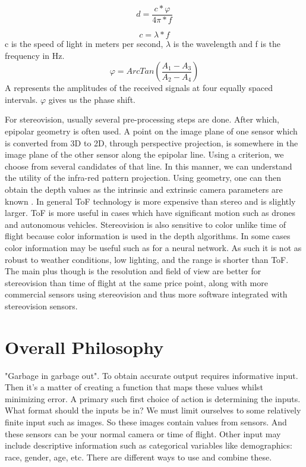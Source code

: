 \begin{equation}
	d = \frac{c * \varphi}{4\pi * f}
\end{equation}


\begin{equation}
c = \lambda * f
\end{equation}
c is the speed of light in meters per second, $\lambda$ is the wavelength and f is the frequency in Hz.
\begin{equation}
	\varphi = ArcTan(\frac{A_1 - A_3}{A_2 - A_4})
\end{equation}
A represents the amplitudes of the received signals at four equally spaced intervals.  $\varphi$ gives us the phase shift.

For stereovision, usually several pre-processing steps are done. After which, epipolar geometry is often used. A point on the image plane of one sensor which is converted from 3D to 2D, through perspective projection, is somewhere in the image plane of the other sensor along the epipolar line. Using a criterion, we choose from several candidates of that line. In this manner, we can understand the utility of the infra-red pattern projection. Using geometry, one can then obtain the depth values as the intrinsic and extrinsic camera parameters are known \cite{ayache1988rectification}. In general ToF technology is more expensive than stereo and is slightly larger. ToF is more useful in cases which have significant motion such as drones and autonomous vehicles. Stereovision is also sensitive to color unlike time of flight because color information is used in the depth algorithms. In some cases color information may be useful such as for a neural network. As such it is not as robust to weather conditions, low lighting, and the range is shorter than ToF. The main plus though is the resolution and field of view are better for stereovision than time of flight at the same price point, along with more commercial sensors using stereovision and thus more software integrated with stereovision sensors.
\section{Overall Philosophy}
"Garbage in garbage out". To obtain accurate output requires informative input. Then it's a matter of creating a function that maps these values whilst minimizing error. A primary such first choice of action is determining the inputs. What format should the inputs be in? We must limit ourselves to some relatively finite input such as images. So these images contain values from sensors. And these sensors can be your normal camera or time of flight. Other input may include descriptive information such as categorical variables like demographics: race, gender, age, etc. There are different ways to use and combine these.

